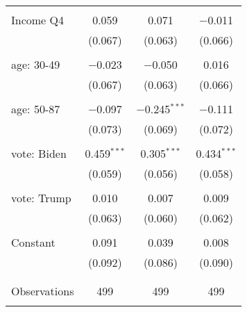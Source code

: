 \begin{tabular}{@{\extracolsep{5pt}}lccc}
  & & & \\ 
 Income Q4 & 0.059 & 0.071 & $-$0.011 \\ 
  & (0.067) & (0.063) & (0.066) \\ 
  & & & \\ 
 age: 30-49 & $-$0.023 & $-$0.050 & 0.016 \\ 
  & (0.067) & (0.063) & (0.066) \\ 
  & & & \\ 
 age: 50-87 & $-$0.097 & $-$0.245$^{***}$ & $-$0.111 \\ 
  & (0.073) & (0.069) & (0.072) \\ 
  & & & \\ 
 vote: Biden & 0.459$^{***}$ & 0.305$^{***}$ & 0.434$^{***}$ \\ 
  & (0.059) & (0.056) & (0.058) \\ 
  & & & \\ 
 vote: Trump & 0.010 & 0.007 & 0.009 \\ 
  & (0.063) & (0.060) & (0.062) \\ 
  & & & \\ 
 Constant & 0.091 & 0.039 & 0.008 \\ 
  & (0.092) & (0.086) & (0.090) \\ 
  & & & \\ 
\hline \\[-1.8ex] 

Observations & 499 & 499 & 499 \\ 
\hline 
\hline \\[-1.8ex] 
\end{tabular} 